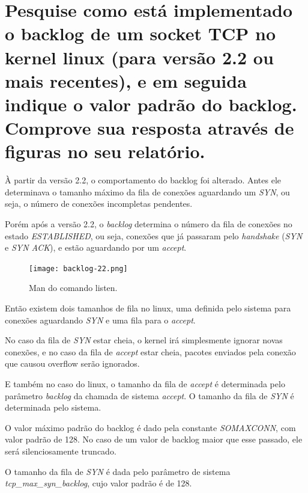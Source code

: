 \documentclass[12pt,a4paper]{report}
\begin{document}



\section{Pesquise como está implementado o backlog de um socket TCP no kernel linux (para
versão 2.2 ou mais recentes), e em seguida indique o valor padrão do backlog.
Comprove sua resposta através de figuras no seu relatório.}

À partir da versão 2.2, o comportamento do backlog foi alterado. Antes ele determinava o tamanho máximo da fila de conexões aguardando um \emph{SYN}, ou seja, o número de conexões incompletas pendentes.

Porém após a versão 2.2, o \emph{backlog} determina o número da fila de conexões no estado \emph{ESTABLISHED}, ou seja, conexões que já passaram pelo \emph{handshake} (\emph{SYN} e \emph{SYN ACK}), e estão aguardando por um \emph{accept}.

\begin{figure}[H]
  \texttt{[image: backlog-22.png]}
  \caption{Man do comando listen.}
\end{figure}

Então existem dois tamanhos de fila no linux, uma definida pelo sistema para conexões aguardando \emph{SYN} e uma fila para o \emph{accept}.

No caso da fila de \emph{SYN} estar cheia, o kernel irá simplesmente ignorar novas conexões, e no caso da fila de \emph{accept} estar cheia, pacotes enviados pela conexão que causou overflow serão ignorados.

E também no caso do linux, o tamanho da fila de \emph{accept} é determinada pelo parâmetro \emph{backlog} da chamada de sistema \emph{accept}. O tamanho da fila de \emph{SYN} é determinada pelo sistema.

O valor máximo padrão do backlog é dado pela constante \emph{SOMAXCONN}, com valor padrão de 128. No caso de um valor de backlog maior que esse passado, ele será silenciosamente truncado.

O tamanho da fila de \emph{SYN} é dada pelo parâmetro de sistema \emph{tcp\_max\_syn\_backlog}, cujo valor padrão é de 128.
\end{document}
